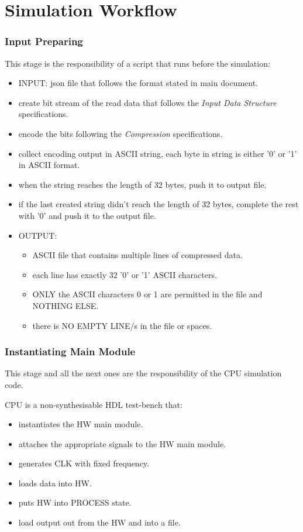 \documentclass[12pt]{report}
\begin{document}
\part{Simulation Workflow}
\section{Input Preparing}
This stage is the responsibility of a script that runs before the simulation:
\begin{itemize}
    \item INPUT: json file that follows the format stated in main document.
    \item create bit stream of the read data that follows the \emph{Input Data Structure} specifications.
    \item encode the bits following the \emph{Compression} specifications.
    \item collect encoding output in ASCII string, each byte in string is either '0' or '1' in ASCII format.
    \item when the string reaches the length of 32 bytes, push it to output file.
    \item if the last created string didn't reach the length of 32 bytes, complete the rest with '0' and push it to the output file.
    \item OUTPUT:
    \begin{itemize}
        \item ASCII file that contains multiple lines of compressed data.
        \item each line has exactly 32 '0' or '1' ASCII characters.
        \item ONLY the ASCII characters 0 or 1 are permitted in the file and NOTHING ELSE.
        \item there is NO EMPTY LINE/s in the file or spaces.
    \end{itemize}
\end{itemize}

\section{Instantiating Main Module}
This stage and all the next ones are the responsibility of the CPU simulation code.

CPU is a non-synthesisable HDL test-bench that:
\begin{itemize}
    \item instantiates the HW main module.
    \item attaches the appropriate signals to the HW main module.
    \item generates CLK with fixed frequency.
    \item loads data into HW.
    \item puts HW into PROCESS state.
    \item load output out from the HW and into a file.
\end{itemize}
\end{document}
